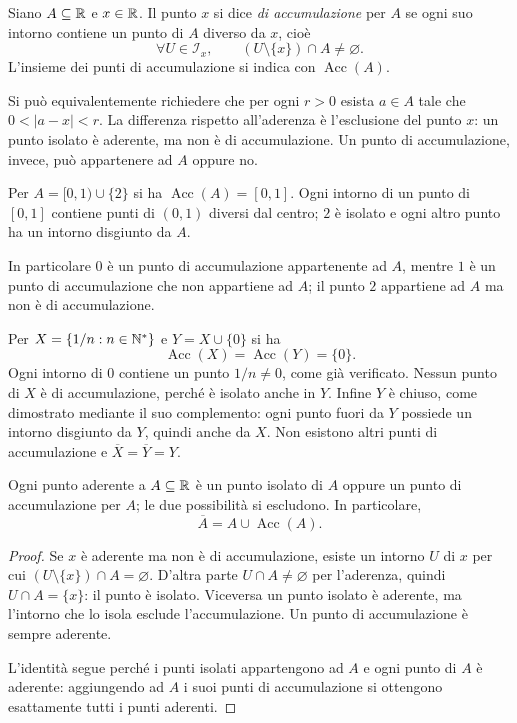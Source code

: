 \begin{definizione}
Siano $A\subseteq\mathbb{R}$ e $x\in\mathbb{R}$. Il punto $x$ si dice \emph{di accumulazione} per $A$ se ogni suo intorno contiene un punto di $A$ diverso da $x$, cioè
\[
\forall U\in\mathcal I_x,\qquad (U\setminus\{x\})\cap A\ne\varnothing.
\]
L'insieme dei punti di accumulazione si indica con $\operatorname{Acc}(A)$.
\end{definizione}

Si può equivalentemente richiedere che per ogni $r>0$ esista $a\in A$ tale che $0<|a-x|<r$. La differenza rispetto all'aderenza è l'esclusione del punto $x$: un punto isolato è aderente, ma non è di accumulazione. Un punto di accumulazione, invece, può appartenere ad $A$ oppure no.

\begin{esempio}
Per $A=[0,1)\cup\{2\}$ si ha $\operatorname{Acc}(A)=[0,1]$. Ogni intorno di un punto di $[0,1]$ contiene punti di $(0,1)$ diversi dal centro; $2$ è isolato e ogni altro punto ha un intorno disgiunto da $A$.

In particolare $0$ è un punto di accumulazione appartenente ad $A$, mentre $1$ è un punto di accumulazione che non appartiene ad $A$; il punto $2$ appartiene ad $A$ ma non è di accumulazione.
\end{esempio}

\begin{esempio}
Per $X=\{1/n:n\in\mathbb{N}^*\}$ e $Y=X\cup\{0\}$ si ha
\[
\operatorname{Acc}(X)=\operatorname{Acc}(Y)=\{0\}.
\]
Ogni intorno di $0$ contiene un punto $1/n\ne0$, come già verificato. Nessun punto di $X$ è di accumulazione, perché è isolato anche in $Y$. Infine $Y$ è chiuso, come dimostrato mediante il suo complemento: ogni punto fuori da $Y$ possiede un intorno disgiunto da $Y$, quindi anche da $X$. Non esistono altri punti di accumulazione e $\overline X=\overline Y=Y$.
\end{esempio}

\begin{proposizione}
Ogni punto aderente a $A\subseteq\mathbb{R}$ è un punto isolato di $A$ oppure un punto di accumulazione per $A$; le due possibilità si escludono. In particolare,
\[
\overline A=A\cup\operatorname{Acc}(A).
\]
\end{proposizione}
\begin{proof}
Se $x$ è aderente ma non è di accumulazione, esiste un intorno $U$ di $x$ per cui $(U\setminus\{x\})\cap A=\varnothing$. D'altra parte $U\cap A\ne\varnothing$ per l'aderenza, quindi $U\cap A=\{x\}$: il punto è isolato. Viceversa un punto isolato è aderente, ma l'intorno che lo isola esclude l'accumulazione. Un punto di accumulazione è sempre aderente.

L'identità segue perché i punti isolati appartengono ad $A$ e ogni punto di $A$ è aderente: aggiungendo ad $A$ i suoi punti di accumulazione si ottengono esattamente tutti i punti aderenti.
\end{proof}

